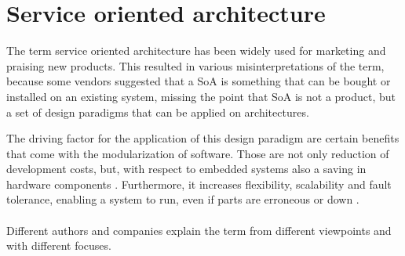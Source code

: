\section{Service oriented architecture}
\label{ch:soa}

The term service oriented architecture has been widely used for marketing and praising new products. This resulted in various misinterpretations of the term, because some vendors suggested that a SoA is something that can be bought or installed on an existing system, missing the point that SoA is not a product, but a set of design paradigms that can be applied on architectures.

The driving factor for the application of this design paradigm are certain benefits that come with the modularization of software. Those are not only reduction of development costs, but, with respect to embedded systems also a saving in hardware components \cite{sommer}. Furthermore, it increases flexibility, scalability and fault tolerance, enabling a system to run, even if parts are erroneous or down \cite[p.33]{rosen} \cite[p.17-18]{josuttis}.
\\
\\
Different authors and companies explain the term from different viewpoints and with different focuses.

